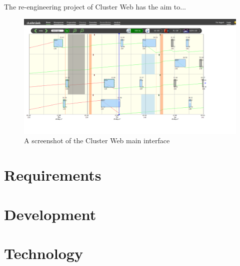 
The re-engineering project of Cluster Web has the aim to...

\begin{figure}[ht]
  \begin{center}
    \includegraphics*[width=1\textwidth]{old_clusterweb}
  \end{center}
  \caption{A screenshot of the Cluster Web main interface}
  \label{fig:old_clusterweb}
\end{figure}

\section{Requirements}

\section{Development}

\section{Technology}


